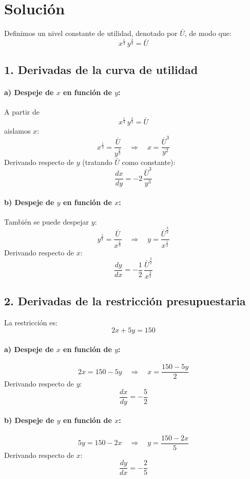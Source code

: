 \documentclass{article}
\begin{document}
\newpage
\section*{Solución}

Definimos un nivel constante de utilidad, denotado por \(\bar{U}\), de modo que:
\[
x^{\frac{1}{3}}\, y^{\frac{2}{3}} = \bar{U}
\]

\subsection*{1. Derivadas de la curva de utilidad}

\paragraph{a) Despeje de \(x\) en función de \(y\):}
A partir de
\[
x^{\frac{1}{3}}\, y^{\frac{2}{3}} = \bar{U}
\]
aislamos \(x\):
\[
x^{\frac{1}{3}} = \frac{\bar{U}}{y^{\frac{2}{3}}} \quad \Longrightarrow \quad x = \frac{\bar{U}^3}{y^2}
\]
Derivando respecto de \(y\) (tratando \(\bar{U}\) como constante):
\[
\frac{dx}{dy} = -2\,\frac{\bar{U}^3}{y^3}
\]

\paragraph{b) Despeje de \(y\) en función de \(x\):}
También se puede despejar \(y\):
\[
y^{\frac{2}{3}} = \frac{\bar{U}}{x^{\frac{1}{3}}} \quad \Longrightarrow \quad y = \frac{\bar{U}^{\frac{3}{2}}}{x^{\frac{1}{2}}}
\]
Derivando respecto de \(x\):
\[
\frac{dy}{dx} = -\frac{1}{2}\,\frac{\bar{U}^{\frac{3}{2}}}{x^{\frac{3}{2}}}
\]

\subsection*{2. Derivadas de la restricción presupuestaria}

La restricción es:
\[
2x+5y=150
\]

\paragraph{a) Despeje de \(x\) en función de \(y\):}
\[
2x = 150-5y \quad \Longrightarrow \quad x = \frac{150-5y}{2}
\]
Derivando respecto de \(y\):
\[
\frac{dx}{dy} = -\frac{5}{2}
\]

\paragraph{b) Despeje de \(y\) en función de \(x\):}
\[
5y = 150-2x \quad \Longrightarrow \quad y = \frac{150-2x}{5}
\]
Derivando respecto de \(x\):
\[
\frac{dy}{dx} = -\frac{2}{5}
\]
\end{document}
